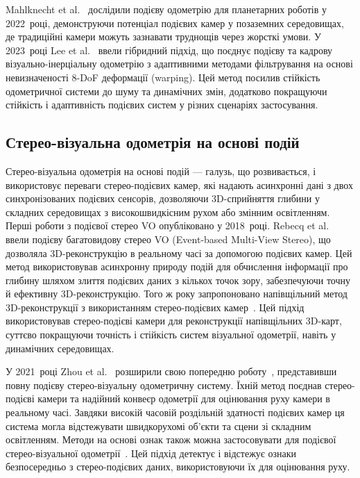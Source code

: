 Mahlknecht et al.~\cite{mahlknecht2022exploring} дослідили подієву одометрію для планетарних роботів у 2022~році, демонструючи потенціал подієвих камер у позаземних середовищах, де традиційні камери можуть зазнавати труднощів через жорсткі умови.
У 2023~році Lee et al.~\cite{lee2023event} ввели гібридний підхід, що поєднує подієву та кадрову візуально-інерціальну одометрію з адаптивними методами фільтрування на основі невизначеності 8-DoF деформації (warping). Цей метод посилив стійкість одометричної системи до шуму та динамічних змін, додатково покращуючи стійкість і адаптивність подієвих систем у різних сценаріях застосування.

\subsection{Стерео-візуальна одометрія на основі подій}
Стерео-візуальна одометрія на основі подій — галузь, що розвивається, і використовує переваги стерео-подієвих камер, які надають асинхронні дані з двох синхронізованих подієвих сенсорів, дозволяючи 3D-сприйняття глибини у складних середовищах з високошвидкісним рухом або змінним освітленням.
Перші роботи з подієвої стерео VO опубліковано у 2018~році. Rebecq et al.~\cite{rebecq2018emvs} ввели подієву багатовидову стерео VO (Event-based Multi-View Stereo), що дозволяла 3D-реконструкцію в реальному часі за допомогою подієвих камер. Цей метод використовував асинхронну природу подій для обчислення інформації про глибину шляхом злиття подієвих даних з кількох точок зору, забезпечуючи точну й ефективну 3D-реконструкцію.
Того ж року запропоновано напівщільний метод 3D-реконструкції з використанням стерео-подієвих камер~\cite{zhou2018semi}. Цей підхід використовував стерео-подієві камери для реконструкції напівщільних 3D-карт, суттєво покращуючи точність і стійкість систем візуальної одометрії, навіть у динамічних середовищах.

У 2021~році Zhou et al.~\cite{zhou2021event} розширили свою попередню роботу~\cite{zhou2018semi}, представивши повну подієву стерео-візуальну одометричну систему. Їхній метод поєднав стерео-подієві камери та надійний конвеєр одометрії для оцінювання руху камери в реальному часі. Завдяки високій часовій роздільній здатності подієвих камер ця система могла відстежувати швидкорухомі об'єкти та сцени зі складним освітленням.
Методи на основі ознак також можна застосовувати для подієвої стерео-візуальної одометрії~\cite{hadviger2021feature, hadviger2023stereo}. Цей підхід детектує і відстежує ознаки безпосередньо з стерео-подієвих даних, використовуючи їх для оцінювання руху.

